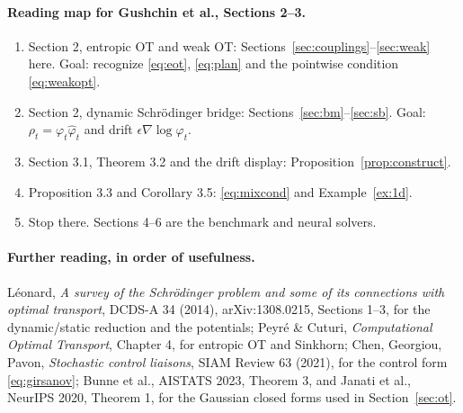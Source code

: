 \documentclass[11pt]{article}
\newcommand{\hphi}{\hat\varphi}
\theoremstyle{definition}
\theoremstyle{plain}
\begin{document}
\paragraph{Reading map for Gushchin et al., Sections 2--3.}
\begin{enumerate}
  \item Section 2, entropic OT and weak OT: Sections~\ref{sec:couplings}--\ref{sec:weak} here.
        Goal: recognize \eqref{eq:eot}, \eqref{eq:plan} and the pointwise condition \eqref{eq:weakopt}.
  \item Section 2, dynamic Schr\"odinger bridge: Sections~\ref{sec:bm}--\ref{sec:sb}.
        Goal: $\rho_t=\varphi_t\hphi_t$ and drift $\epsilon\nabla\log\varphi_t$.
  \item Section 3.1, Theorem 3.2 and the drift display: Proposition~\ref{prop:construct}.
  \item Proposition 3.3 and Corollary 3.5: \eqref{eq:mixcond} and Example~\ref{ex:1d}.
  \item Stop there. Sections 4--6 are the benchmark and neural solvers.
\end{enumerate}

\paragraph{Further reading, in order of usefulness.}
L\'eonard, \emph{A survey of the Schr\"odinger problem and some of its connections with
optimal transport}, DCDS-A 34 (2014), arXiv:1308.0215, Sections 1--3, for the dynamic/static
reduction and the potentials; Peyr\'e \& Cuturi, \emph{Computational Optimal Transport},
Chapter 4, for entropic OT and Sinkhorn; Chen, Georgiou, Pavon, \emph{Stochastic control
liaisons}, SIAM Review 63 (2021), for the control form \eqref{eq:girsanov}; Bunne et al.,
AISTATS 2023, Theorem 3, and Janati et al., NeurIPS 2020, Theorem 1, for the Gaussian
closed forms used in Section~\ref{sec:ot}.
\end{document}
